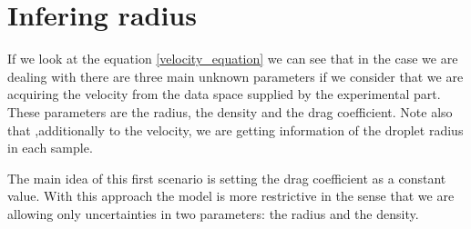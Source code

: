 \documentclass{article}
\begin{document}
\renewcommand{\figurename}{\textbf{Figure}} 
\renewcommand\thefigure{\textbf{\arabic{figure}}} 




\section{Infering radius}

If we look at the equation \ref{velocity_equation} we can see that in the case we are dealing with there are three main unknown parameters if we consider that we are acquiring the velocity from the data space supplied by the experimental part. These parameters are the radius, the density and the drag coefficient. Note also that ,additionally to the velocity, we are getting information of the droplet radius in each sample.
\par \noindent
The main idea of this first scenario  is setting the drag coefficient as a constant value. With this approach the  model is more restrictive in the sense that we are allowing  only uncertainties in two parameters: the radius and the density.
\par \noindent
\end{document}
